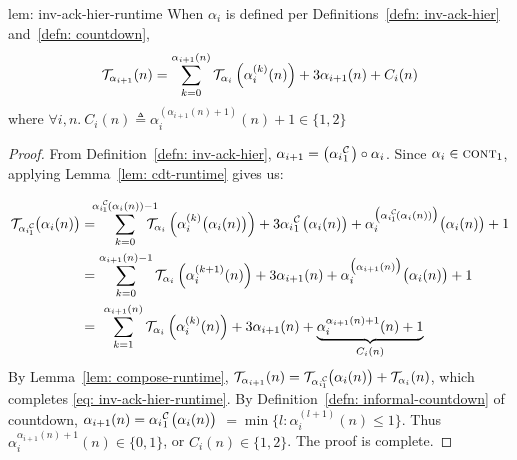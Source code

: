 \begin{uselemcounterof}{lem: inv-ack-hier-runtime}
	When $\alpha_i$ is defined per Definitions~\ref{defn: inv-ack-hier}
	and~\ref{defn: countdown},
	\begin{equation} \label{eq: inv-ack-hier-runtime}
	\mathcal{T}_{\alpha_{i+1}}(n) = \sum_{k=0}^{\alpha_{i+1}(n)}\mathcal{T}_{\alpha_i}\left( \alpha_i^{(k)}(n)\right) + 3\alpha_{i+1}(n) + C_i(n)
	\end{equation}
	\hspace{7em}where $\forall i, n.~C_i(n) \triangleq \alpha_i^{(\alpha_{i+1}(n) + 1)}(n) + 1 \in \{1, 2\}$
\end{uselemcounterof}

\begin{proof}
	 From Definition~\ref{defn: inv-ack-hier}, $\alpha_{i+1} = \big(\cdt{\alpha_i}{1}\big)\circ \alpha_i$. Since $\alpha_i\in \text{\scshape{cont}}_{1}$, applying Lemma~\ref{lem: cdt-runtime} gives us:

	 \begin{equation*}
	 \begin{aligned}
	 \runtime_{\cdt{\alpha_i}{1}}\big(\alpha_i(n)\big)
	 & = \hspace{-5pt} \sum_{k=0}^{\cdt{\alpha_i}{1}(\alpha_i(n)) - 1} \hspace{-10pt} \runtime_{\alpha_i}\left(\alpha_i^{(k)}\big(\alpha_i(n)\big)\right)
	 + 3\cdt{\alpha_i}{1}\big(\alpha_i(n)\big)
	 + \alpha_i^{\big(\cdt{\alpha_i}{1}(\alpha_i(n))\big)}\big(\alpha_i(n)\big) + 1 \\
	 & = \sum_{k=0}^{\alpha_{i+1}(n) - 1} \runtime_{\alpha_i}\left(\alpha_i^{(k+1)}(n)\right)
	 + 3\alpha_{i+1}(n)
	 + \alpha_i^{\big(\alpha_{i+1}(n)\big)}\big(\alpha_i(n)\big) + 1 \\
	 & = \ \sum_{k=1}^{\alpha_{i+1}(n)} \runtime_{\alpha_i}\left(\alpha_i^{(k)}(n)\right)
	 + 3\alpha_{i+1}(n)
	 + \underbrace{\alpha_i^{\alpha_{i+1}(n) + 1}(n) + 1}_{C_i(n)}
	 \end{aligned}
	 \end{equation*}By Lemma~\ref{lem: compose-runtime}, $\runtime_{\alpha_{i+1}}(n) = \runtime_{\cdt{\alpha_i}{1}}\big(\alpha_i(n)\big) + \runtime_{\alpha_i}(n)$, which completes \eqref{eq: inv-ack-hier-runtime}. By Definition~\ref{defn: informal-countdown} of countdown, $\alpha_{i+1}(n) = \cdt{\alpha_i}{1}\big(\alpha_i(n)\big)$
	 $= \min\big\{l: \alpha_i^{(l+1)}(n)\le 1\big\}$. Thus $\alpha_i^{\alpha_{i+1}(n) + 1}(n) \in \{0, 1\}$, or $C_i(n)\in \{1, 2\}$. The proof is complete.
\end{proof}

